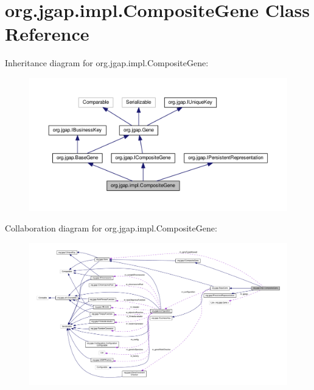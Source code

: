 \hypertarget{classorg_1_1jgap_1_1impl_1_1_composite_gene}{\section{org.\-jgap.\-impl.\-Composite\-Gene Class Reference}
\label{classorg_1_1jgap_1_1impl_1_1_composite_gene}
}


Inheritance diagram for org.\-jgap.\-impl.\-Composite\-Gene\-:
\nopagebreak
\begin{figure}[H]
\begin{center}
\leavevmode
\includegraphics[width=350pt]{classorg_1_1jgap_1_1impl_1_1_composite_gene__inherit__graph}
\end{center}
\end{figure}


Collaboration diagram for org.\-jgap.\-impl.\-Composite\-Gene\-:
\nopagebreak
\begin{figure}[H]
\begin{center}
\leavevmode
\includegraphics[width=350pt]{classorg_1_1jgap_1_1impl_1_1_composite_gene__coll__graph}
\end{center}
\end{figure}
